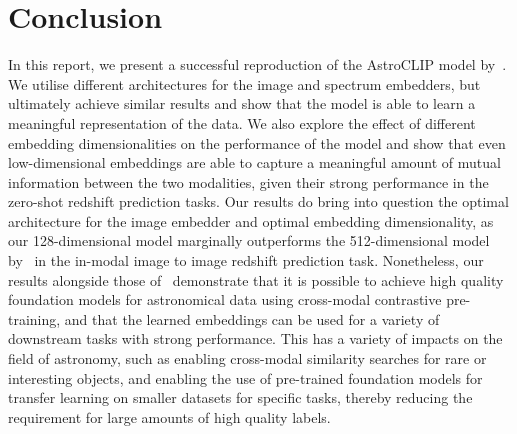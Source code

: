 
\section{Conclusion}\label{sec:conclusion}
In this report, we present a successful reproduction of the AstroCLIP model by~\cite{astroclip}.
We utilise different architectures for the image and spectrum embedders, but ultimately achieve similar results
and show that the model is able to learn a meaningful representation of the data.
We also explore the effect of different embedding dimensionalities on the performance of the model and show that
even low-dimensional embeddings are able to capture a meaningful amount of mutual information between the two modalities,
given their strong performance in the zero-shot redshift prediction tasks.
Our results do bring into question the optimal architecture for the image embedder and optimal
embedding dimensionality, as our 128-dimensional model marginally outperforms the 512-dimensional model by~\cite{astroclip}
in the in-modal image to image redshift prediction task.
Nonetheless, our results alongside those of~\cite{astroclip} demonstrate that it is possible to achieve high quality foundation
models for astronomical data using cross-modal contrastive pre-training, and that the learned embeddings can be used for a variety
of downstream tasks with strong performance.
This has a variety of impacts on the field of astronomy, such as enabling cross-modal similarity searches for rare or interesting
objects, and enabling the use of pre-trained foundation models for transfer learning on smaller datasets for specific tasks,
thereby reducing the requirement for large amounts of high quality labels.
